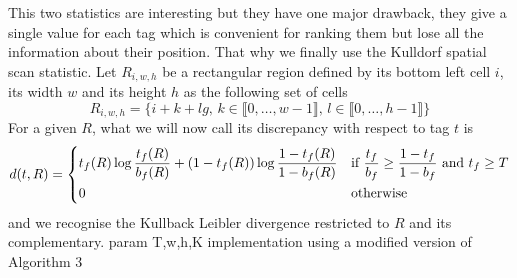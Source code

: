 This two statistics are interesting but they have one major drawback, they
give a single value for each tag which is convenient for ranking them but lose
all the information about their position. That why we finally use the Kulldorf
spatial scan statistic\cite{kulldorff}. Let $R_{i,w,h}$ be a rectangular region
defined by its bottom left cell $i$, its width $w$ and its height $h$ as the
following set of cells \[R_{i,w,h} = \{i + k + lg,\, k\in\llbracket 0,\dots,
w-1\rrbracket,\, l\in\llbracket 0,\dots, h-1\rrbracket\}\] For a given $R$,
what we will now call its discrepancy with respect to tag $t$ is
\[
	d(t, R) =
\begin{dcases}
	t_f(R)\log\frac{t_f(R)}{b_f(R)} + (1-t_f(R))\log\frac{1-t_f(R)}{1-b_f(R)}
	& \text{if } \frac{t_f}{b_f} \geq \frac{1-t_f}{1-b_f} \text{ and } t_f \geq T\\
	0 & \text{otherwise}
\end{dcases}
\]
and we recognise the Kullback Leibler divergence restricted to $R$ and its
complementary.
param T,w,h,K implementation using a modified version of Algorithm 3 \cite{Agarwal2006spatial}
